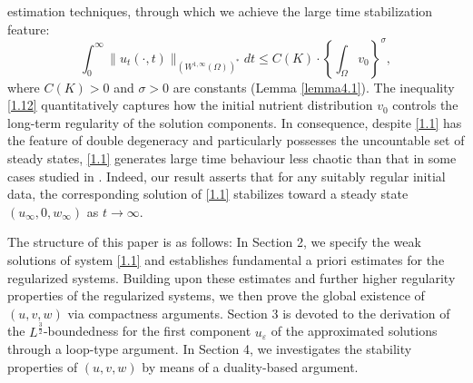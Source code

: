 \documentclass[12pt]{article}
\theoremstyle{plain}
\theoremstyle{definition}
\numberwithin{equation}{section}
\begin{document}
  estimation techniques, through which we achieve the large  time stabilization feature:
 \begin{equation}\label{1.12}
 \int_0^{\infty}\|u_t(\cdot,t)\|_{(W^{1,\infty}(\Omega))^*}dt\leq C(K)\cdot\left\{\int_{\Omega} v_0\right\}^\sigma,
 \end{equation}
where $C(K)>0$ and $\sigma>0$ are constants (Lemma \ref{lemma4.1}). The inequality \eqref{1.12} quantitatively captures how the initial nutrient distribution $v_0$ controls the long-term regularity of the solution components. In consequence, despite
  \eqref{1.1} has  the feature of double degeneracy and particularly possesses the  uncountable set of steady states,  \eqref{1.1}  generates large time behaviour less chaotic  than  that in  some cases studied in \cite{PS2002,PY2003,WJDDE}. Indeed,  our result asserts that
  for any suitably regular initial data, the corresponding
 solution of \eqref{1.1}  stabilizes toward  a steady state $(u_{\infty},0,w_{\infty})$ as $t\to \infty$.

  The structure of this paper is as follows: In Section 2,  we specify the weak solutions of system \eqref{1.1} and
 establishes fundamental a priori estimates for the regularized systems. Building upon these estimates and further higher regularity properties of the regularized systems, we then
    prove the global existence of $(u,v,w)$ via compactness arguments.
Section 3 is devoted to the derivation of the $L^{\frac3 2}$-boundedness for the first component $u_\varepsilon$ of
the approximated solutions through a  loop-type argument. %
 In Section 4, we investigates the stability properties of $(u,v,w)$ by means of a duality-based argument.
\end{document}
